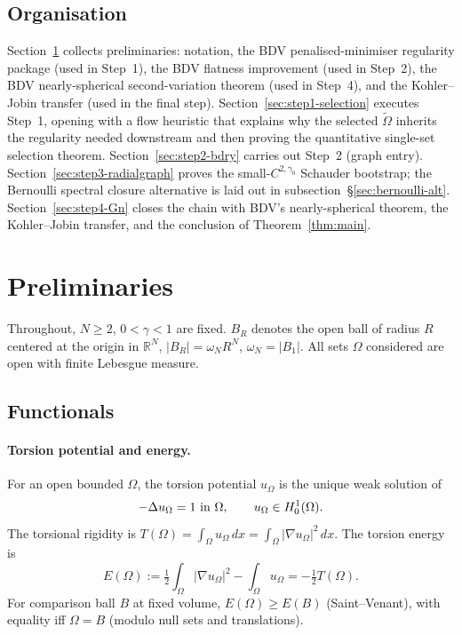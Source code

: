 \documentclass[11pt]{amsart}
\theoremstyle{definition}
\newcommand{\R}{\mathbb R}
\newcommand{\abs}[1]{\left|#1\right|}
\renewcommand{\d}{\,d}
\begin{document}
\subsection*{Organisation}

Section~\ref{sec:prelim} collects preliminaries: notation, the BDV
penalised-minimiser regularity package (used in Step~1), the BDV
flatness improvement (used in Step~2), the BDV nearly-spherical
second-variation theorem (used in Step~4), and the Kohler--Jobin
transfer (used in the final step).
Section~\ref{sec:step1-selection} executes Step~1, opening with a
flow heuristic that explains why the selected $\widetilde\Omega$
inherits the regularity needed downstream and then proving the
quantitative single-set selection theorem.
Section~\ref{sec:step2-bdry} carries out Step~2 (graph entry).
Section~\ref{sec:step3-radialgraph} proves the small-$C^{2,\gamma_0}$
Schauder bootstrap; the Bernoulli spectral closure alternative is
laid out in subsection~\S\ref{sec:bernoulli-alt}.
Section~\ref{sec:step4-Gn} closes the chain with BDV's
nearly-spherical theorem, the Kohler--Jobin transfer, and the
conclusion of Theorem~\ref{thm:main}.

\section{Preliminaries}\label{sec:prelim}

Throughout, $N\ge2$, $0<\gamma<1$ are fixed. $B_R$ denotes the open ball
of radius $R$ centered at the origin in $\R^N$, $\abs{B_R}=\omega_NR^N$,
$\omega_N=\abs{B_1}$. All sets $\Omega$ considered are open with finite
Lebesgue measure.

\subsection{Functionals}

\paragraph{Torsion potential and energy.}
For an open bounded $\Omega$, the torsion potential $u_\Omega$ is the unique
weak solution of
\[
-\Delta u_\Omega=1\hbox{ in }\Omega,\qquad u_\Omega\in H^1_0(\Omega).
\]
The torsional rigidity is $T(\Omega)=\int_\Omega u_\Omega\d x
=\int_\Omega\abs{\nabla u_\Omega}^2\d x$. The torsion energy is
\[
E(\Omega):=\tfrac12\int_\Omega\abs{\nabla u_\Omega}^2-\int_\Omega u_\Omega
=-\tfrac12 T(\Omega).
\]
For comparison ball $B$ at fixed volume,
$E(\Omega)\ge E(B)$ (Saint--Venant), with equality iff $\Omega=B$
(modulo null sets and translations).
\end{document}
